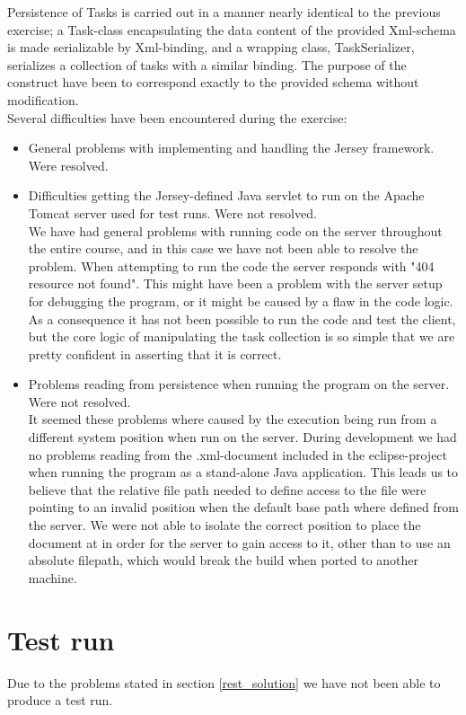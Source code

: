 Persistence of Tasks is carried out in a manner nearly identical to the previous exercise; a Task-class encapsulating the data content of the provided Xml-schema is made serializable by Xml-binding, and a wrapping class, TaskSerializer, serializes a collection of tasks with a similar binding. The purpose of the construct have been to correspond exactly to the provided schema without modification.\\

Several difficulties have been encountered during the exercise:
\begin{itemize}
	\item General problems with implementing and handling the Jersey framework. Were resolved.
	\item Difficulties getting the Jersey-defined Java servlet to run on the Apache Tomcat server used for test runs. Were not resolved.\\
	We have had general problems with running code on the server throughout the entire course, and in this case we have not been able to resolve the problem. When attempting to run the code the server responds with "404 resource not found". This might have been a problem with the server setup for debugging the program, or it might be caused by a flaw in the code logic. As a consequence it has not been possible to run the code and test the client, but the core logic of manipulating the task collection is so simple that we are pretty confident in asserting that it is correct.
	\item Problems reading from persistence when running the program on the server. Were not resolved.\\
	It seemed these problems where caused by the execution being run from a different system position when run on the server. During development we had no problems reading from the .xml-document included in the eclipse-project when running the program as a stand-alone Java application. This leads us to believe that the relative file path needed to define access to the file were pointing to an invalid position when the default base path where defined from the server. We were not able to isolate the correct position to place the document at in order for the server to gain access to it, other than to use an absolute filepath, which would break the build when ported to another machine.
\end{itemize}
\section{Test run}
\label{rest_test}
	Due to the problems stated in section \ref{rest_solution} we have not been able to produce a test run.
